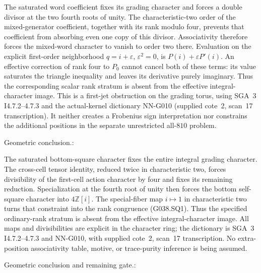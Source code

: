 \begin{geometricstatement}[NN-G038]
The saturated word coefficient fixes its grading character and
forces a double divisor at the two fourth roots of unity.  The
characteristic-two order of the mixed-generator coefficient,
together with its rank modulo four, prevents that coefficient
from absorbing even one copy of this divisor.  Associativity
therefore forces the mixed-word character to vanish to order
two there.  Evaluation on the explicit first-order neighborhood
$q=i+\varepsilon$, $\varepsilon^2=0$, is
$P(i)+\varepsilon P'(i)$.  An effective correction of rank four
to $P_0$ cannot cancel both of these terms: its value saturates
the triangle inequality and leaves its derivative purely
imaginary.  Thus the corresponding scalar rank stratum is absent
from the effective integral-character image.  This is a
first-jet obstruction on the grading torus, using SGA~3
I4.7.2--4.7.3 and the actual-kernel dictionary NN-G010
(supplied cote~2, scan~17 transcription).  It neither creates
a Frobenius sign interpretation nor constrains the additional
positions in the separate unrestricted all-$810$ problem.



Geometric conclusion.:

The saturated bottom-square character fixes the entire integral
grading character.  The cross-cell tensor identity, reduced twice
in characteristic two, forces divisibility of the first-cell
action character by four and fixes its remaining reduction.
Specialization at the fourth root of unity then forces the
bottom self-square character into $4\mathbb Z[i]$.
The special-fiber map $i\mapsto1$ in characteristic two turns
that constraint into the rank congruence (G038.SQ1).  Thus the
specified ordinary-rank stratum is absent from the effective
integral-character image.  All maps and divisibilities are
explicit in the character ring; the dictionary is SGA~3
I4.7.2--4.7.3 and NN-G010, with supplied cote~2, scan~17
transcription.  No extra-position associativity table, motive,
or trace-purity inference is being assumed.


Geometric conclusion and remaining gate.:


\end{geometricstatement}
